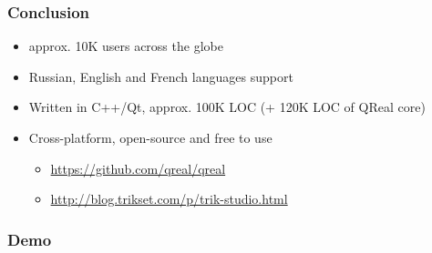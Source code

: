 \documentclass[xetex,mathserif,serif]{beamer}
\begin{document}
	\begin{frame}
		\frametitle{Conclusion}
		\begin{itemize}
			\item approx. 10K users across the globe
			\item Russian, English and French languages support
			\item Written in C++/Qt, approx. 100K LOC (+ 120K LOC of QReal core)
			\item Cross-platform, open-source and free to use
			\begin{itemize}
				\item \href{https://github.com/qreal/qreal}{https://github.com/qreal/qreal}
				\item \href{http://blog.trikset.com/p/trik-studio.html}{http://blog.trikset.com/p/trik-studio.html}
			\end{itemize}
		\end{itemize}
	\end{frame}

	\begin{frame}
		\frametitle{Demo}
		\center{\Huge{\textcolor{green}{Demonstration}}}
	\end{frame}
\end{document}
